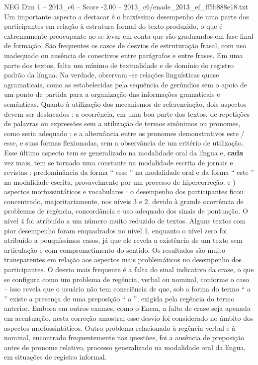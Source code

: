 \begin{textsample}{NEG Dim 1 – 2013\_c6 – Score -2.00 – 2013\_c6/enade\_2013\_ef\_ff5b888e18.txt}
Um importante aspecto a destacar é o baixíssimo desempenho de uma parte dos participantes em relação à estrutura formal do texto produzido, o que é extremamente preocupante ao se levar em conta que são graduandos em fase final de formação.
São frequentes os casos de desvios de estruturação frasal, com uso inadequado ou ausência de conectivos entre parágrafos e entre frases.
Em uma parte dos textos, falta um mínimo de textualidade e de domínio do registro padrão da língua.
Na verdade, observam -se relações linguísticas quase agramaticais, como as estabelecidas pela sequência de gerúndios sem o apoio de um ponto de partida para a organização das informações gramaticais e semânticas.
Quanto à utilização dos mecanismos de referenciação, dois aspectos devem ser destacados : a ocorrência, em uma boa parte dos textos, de repetições de palavras ou expressões sem a utilização de termos sinônimos ou pronomes, como seria adequado ; e a alternância entre os pronomes demonstrativos este / esse, e suas formas flexionadas, sem a observância de um critério de utilização.
Esse último aspecto tem se generalizado na modalidade oral da língua e, \textbf{cada} vez mais, tem se tornado uma constante na modalidade escrita de jornais e revistas : predominância da forma “ esse ” na modalidade oral e da forma “ este ” na modalidade escrita, provavelmente por um processo de hipercorreção. c ) aspectos morfossintáticos e vocabulares : o desempenho dos participantes ficou concentrado, majoritariamente, nos níveis 3 e 2, devido à grande ocorrência de problemas de regência, concordância e uso adequado dos sinais de pontuação.
O nível 4 foi atribuído a um número muito reduzido de textos.
Alguns textos com pior desempenho foram enquadrados no nível 1, enquanto o nível zero foi atribuído a pouquíssimos casos, já que ele revela a existência de um texto sem articulação e com comprometimento do sentido.
Os resultados são muito transparentes em relação aos aspectos mais problemáticos no desempenho dos participantes.
O desvio mais frequente é a falta do sinal indicativo da crase, o que se configura como um problema de regência, verbal ou nominal, conforme o caso – isso revela que o usuário não tem consciência de que, sob a forma do termo “ a ” existe a presença de uma preposição “ a ”, exigida pela regência do termo anterior.
Embora em outros exames, como o Enem, a falta de crase seja apenada em acentuação, nesta correção amostral esse desvio foi considerado no âmbito dos aspectos morfossintáticos.
Outro problema relacionado à regência verbal e à nominal, encontrado frequentemente nas questões, foi a ausência de preposição antes de pronome relativo, processo generalizado na modalidade oral da língua, em situações de registro informal.

\end{textsample}
